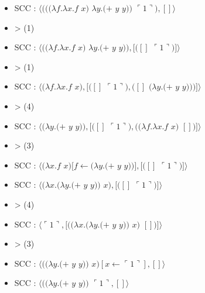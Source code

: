 \documentclass[10pt,a4paper]{article}
\begin{document}
					\begin{multicols}{2}\raggedright{
							\begin{itemize}
								\item[] SCC : $\langle(((\lambda f.\lambda x.f$ $x)$ $\lambda y.(+$ $y$ $y))$ $\ulcorner 1\urcorner),[]\rangle$
								\item[] > (1)
								\item[] SCC : $\langle((\lambda f.\lambda x.f$ $x)$ $\lambda y.(+$ $y$ $y)),[([]$ $\ulcorner 1\urcorner)]\rangle$
								\item[] > (1)
								\item[] SCC : $\langle(\lambda f.\lambda x.f$ $x),[([]$ $\ulcorner 1\urcorner),([]$ $(\lambda y.(+$ $y$ $y)))]\rangle$
								\item[] > (4)
								\item[] SCC : $\langle(\lambda y.(+$ $y$ $y)),[([]$ $\ulcorner 1\urcorner),((\lambda f.\lambda x.f$ $x)$ $[])]\rangle$
								\item[] > (3) 
								\item[] SCC : $\langle(\lambda x.f$ $x)[f\leftarrow(\lambda y.(+$ $y$ $y))],[([]$ $\ulcorner 1\urcorner)]\rangle$
								\item[] SCC : $\langle(\lambda x.(\lambda y.(+$ $y$ $y))$ $x),[([]$ $\ulcorner 1\urcorner)]\rangle$
								\item[] > (4) 
								\item[] SCC : $\langle\ulcorner 1\urcorner,[((\lambda x.(\lambda y.(+$ $y$ $y))$ $x)$ $[])]\rangle$
								\item[] > (3) 
								\item[] SCC : $\langle((\lambda y.(+$ $y$ $y))$ $x)[x \leftarrow\ulcorner 1\urcorner],[]\rangle$
								\item[] SCC : $\langle((\lambda y.(+$ $y$ $y))$ $\ulcorner 1\urcorner,[]\rangle$
							\end{itemize}
							
}
\end{multicols}
\end{document}
